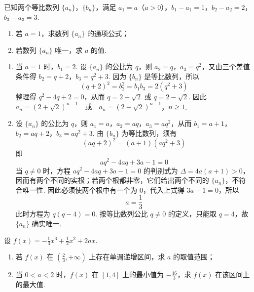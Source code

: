 \begin{problem}
已知两个等比数列 \(\{a_{n}\}\)，\(\{b_{n}\}\)，满足 \(a_{1} = a\)（\(a > 0\)），\(b_{1} - a_{1} = 1\)，\(b_{2} - a_{2} = 2\)，\(b_{3} - a_{3} = 3\).
\begin{enumerate}
\item 若 \(a = 1\)，求数列 \(\{a_{n}\}\) 的通项公式；
\item 若数列 \(\{a_{n}\}\) 唯一，求 \(a\) 的值.
\end{enumerate}
\end{problem}

\begin{solution}
\begin{enumerate}
\item 当 \(a=1\) 时，\(b_1=2\). 设 \(\{a_n\}\) 的公比为 \(q\)，则
\(a_2=q\)，\(a_3=q^2\)，又由三个差值条件得
\(b_2=q+2\)，\(b_3=q^2+3\). 因为 \(\{b_n\}\) 是等比数列，所以
\[
(q+2)^2=b_2^2=b_1b_3=2(q^2+3)
\]
整理得 \(q^2-4q+2=0\)，从而
\(q=2+\sqrt2\) 或 \(q=2-\sqrt2\). 因此
\(a_n=(2+\sqrt2)^{n-1}\quad\text{或}\quad a_n=(2-\sqrt2)^{n-1}\)，\(n\geqslant1\).

\item 设 \(\{a_n\}\) 的公比为 \(q\)，则
\(a_1=a\)，\(a_2=aq\)，\(a_3=aq^2\)，从而
\(b_1=a+1\)，\(b_2=aq+2\)，\(b_3=aq^2+3\). 由 \(\{b_n\}\) 为等比数列，须有
\[
(aq+2)^2=(a+1)(aq^2+3)
\]
即
\[
aq^2-4aq+3a-1=0
\]
当 \(q\neq0\) 时，方程
\(aq^2-4aq+3a-1=0\) 的判别式为
\(\Delta=4a(a+1)>0\)，因而有两个不同的实根；若两个根都非零，它们给出两个不同的 \(\{a_n\}\)，不符合唯一性. 因此必须使两个根中有一个为 \(0\)，代入上式得 \(3a-1=0\)，所以
\[
a=\frac{1}{3}
\]
此时方程为 \(q(q-4)=0\). 按等比数列公比 \(q\neq0\) 的定义，只能取 \(q=4\)，故 \(\{a_n\}\) 确实唯一.
\end{enumerate}
\end{solution}

\begin{problem}
设 \( f(x) = -\frac{1}{3} x^3 + \frac{1}{2} x^2 + 2ax \).
\begin{enumerate}
\item 若 \( f(x) \) 在 \( \left(\frac{2}{3}, +\infty\right) \) 上存在单调递增区间，求 \(a\) 的取值范围；
\item 当 \(0 < a < 2\) 时，\( f(x) \) 在 \([1, 4]\) 上的最小值为 \(-\frac{16}{3}\)，求 \( f(x) \) 在该区间上的最大值.
\end{enumerate}
\end{problem}

